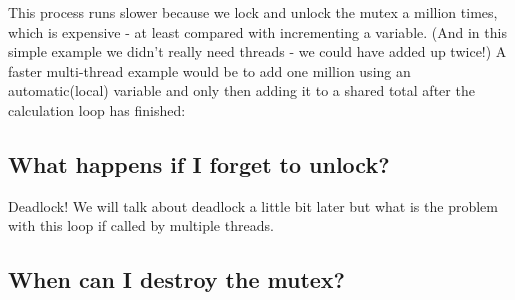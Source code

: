 This process runs slower because we lock and unlock the mutex a million
times, which is expensive - at least compared with incrementing a
variable. (And in this simple example we didn't really need threads - we
could have added up twice!) A faster multi-thread example would be to
add one million using an automatic(local) variable and only then adding
it to a shared total after the calculation loop has finished:

\begin{Shaded}
\begin{Highlighting}[]
     \NormalTok{;}
     
       \NormalTok{;}
    \NormalTok{\}}


     
\NormalTok{\}}
\end{Highlighting}
\end{Shaded}

\subsection{What happens if I forget to
unlock?}\label{what-happens-if-i-forget-to-unlock}

Deadlock! We will talk about deadlock a little bit later but what is the
problem with this loop if called by multiple threads.

\begin{Shaded}
\end{Shaded}

\subsection{When can I destroy the
mutex?}\label{when-can-i-destroy-the-mutex}

